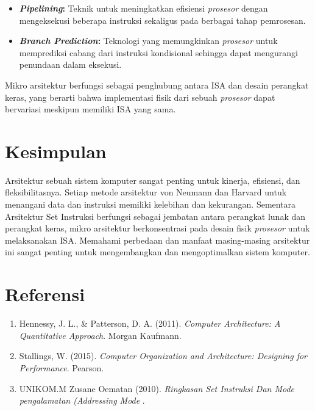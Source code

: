 \documentclass{article}
\begin{document}
\begin{itemize}
  \item \textbf{\textit{Pipelining}:} Teknik untuk meningkatkan efisiensi \textit{prosesor} dengan mengeksekusi beberapa instruksi sekaligus pada berbagai tahap pemrosesan.

  \item \textbf{\textit{Branch Prediction}:} Teknologi yang memungkinkan \textit{prosesor} untuk memprediksi cabang dari instruksi kondisional sehingga dapat mengurangi penundaan dalam eksekusi.
\end{itemize}

Mikro arsitektur berfungsi sebagai penghubung antara ISA dan desain perangkat keras, yang berarti bahwa implementasi fisik dari sebuah \textit{prosesor} dapat bervariasi meskipun memiliki ISA yang sama.

\section{Kesimpulan}

Arsitektur sebuah sistem komputer sangat penting untuk kinerja, efisiensi, dan fleksibilitasnya. Setiap metode arsitektur von Neumann dan Harvard untuk menangani data dan instruksi memiliki kelebihan dan kekurangan. Sementara Arsitektur Set Instruksi berfungsi sebagai jembatan antara perangkat lunak dan perangkat keras, mikro arsitektur berkonsentrasi pada desain fisik \textit{prosesor} untuk melaksanakan ISA. Memahami perbedaan dan manfaat masing-masing arsitektur ini sangat penting untuk mengembangkan dan mengoptimalkan sistem komputer.

\section{Referensi}

\begin{enumerate}
  \item Hennessy, J. L., \& Patterson, D. A. (2011). \textit{Computer Architecture: A Quantitative Approach}. Morgan Kaufmann.
  \item Stallings, W. (2015). \textit{Computer Organization and Architecture: Designing for Performance}. Pearson.
  \item UNIKOM.M Zusane Oematan (2010).  \textit{Ringkasan Set Instruksi Dan Mode pengalamatan (Addressing Mode }. 
\end{enumerate}
\end{document}
